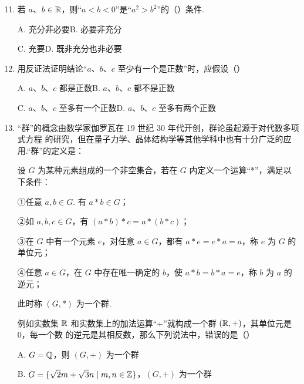 \documentclass[a4paper,11pt]{article}
\begin{document}
\begin{enumerate}
\setcounter{enumi}{10}

\item 若 $a$、$b\in\mathbb{R}$，则“$a<b<0$”是“$a^2>b^2$”的\mbox{（\quad）}条件.

\keepwithprev
A. 充分非必要\qquad B. 必要非充分

C. 充要\qquad D. 既非充分也非必要

\ifanswer
\solbegin
{}
\solend
\fi

\item 用反证法证明结论“$a$、$b$、$c$ 至少有一个是正数”时，应假设\mbox{（\quad）}

\keepwithprev
A. $a$、$b$、$c$ 都是正数\qquad B. $a$、$b$、$c$ 都不是正数

C. $a$、$b$、$c$ 至多有一个正数\qquad D. $a$、$b$、$c$ 至多有两个正数

\ifanswer
{}
\fi

\item “群”的概念由数学家伽罗瓦在 19 世纪 30 年代开创，群论虽起源于对代数多项式方程
的研究，但在量子力学、晶体结构学等其他学科中也有十分广泛的应用.“群”的定义是：

设 $G$ 为某种元素组成的一个非空集合，若在 $G$ 内定义一个运算“*”，满足以下条件：

①任意 $a,b\in G$. 有 $a*b\in G$；

②如 $a,b,c\in G$，有 $(a*b)*c=a*(b*c)$；

③在 $G$ 中有一个元素 $e$，对任意 $a\in G$，都有 $a*e=e*a=a$，称 $e$ 为 $G$ 的单位元；

④任意 $a\in G$，在 $G$ 中存在唯一确定的 $b$，使 $a*b=b*a=e$，称 $b$ 为 $a$ 的逆元；

此时称 $(G,*)$ 为一个群.

例如实数集 $\mathbb{R}$ 和实数集上的加法运算“+”就构成一个群 $(\mathbb{R},+)$，其单位元是 0，每一个数
的逆元是其相反数，那么下列说法中，错误的是\mbox{（\quad）}

\keepwithprev
A. $G=\mathbb{Q}$，则 $(G,+)$ 为一个群

B. $G=\{\sqrt2m+\sqrt3n\mid m,n\in\mathbb{Z}\}$，$(G,+)$ 为一个群


\end{enumerate}
\end{document}
